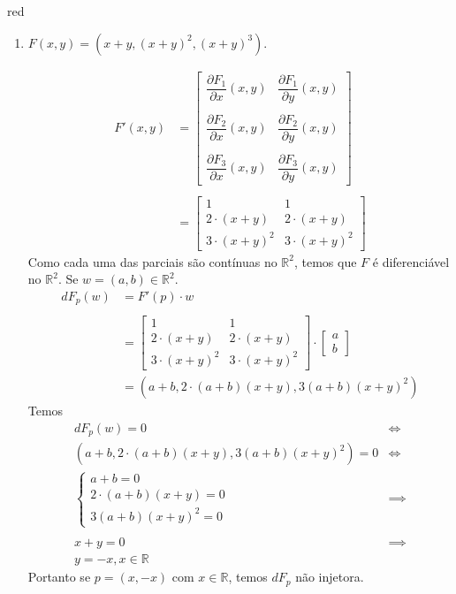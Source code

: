 \documentclass[12pt,leqno,twoside]{amsart}
\theoremstyle{definition}
\begin{document}
\begin{color}{red}
\begin{enumerate}
\begin{enumerate}
			\item $F(x,y) = \left(x+y, (x+y)^2,(x+y)^3\right)$.


				\begin{align*}
					F'(x,y) &= \left[\begin{array}{cc} \dfrac{\partial F_1}{\partial x} (x,y) &\dfrac{\partial F_1}{\partial y} (x,y)  \\~\\ \dfrac{\partial F_2}{\partial x} (x,y) &\dfrac{\partial F_2}{\partial y} (x,y)  \\~\\ \dfrac{\partial F_3}{\partial x} (x,y) &\dfrac{\partial F_3}{\partial y} (x,y)  \end{array}\right] \\~\\
						&= \left[\begin{array}{cc} 1 & 1\\ 2\cdot(x+y)& 2\cdot(x+y) \\ 3\cdot(x+y)^2 &  3\cdot(x+y)^2 \end{array}\right]
				\end{align*}
				Como cada uma das parciais são contínuas no $\mathbb{R}^2$, temos que $F$ é diferenciável no $\mathbb{R}^2$. Se $w = (a,b) \in \mathbb{R}^2$. \\
				\begin{align*}
					dF_p(w) &= F'(p)\cdot w\\~\\
					&= \left[\begin{array}{cc} 1 & 1\\ 2\cdot(x+y)& 2\cdot(x+y) \\ 3\cdot(x+y)^2 &  3\cdot(x+y)^2 \end{array}\right] \cdot  \left[\begin{array}{c} a \\ b \end{array}\right] \\
						&= \left(a+b, 2\cdot(a+b)(x+y), 3(a+b)(x+y)^2\right)
				\end{align*}
				Temos
				\begin{align*}
					dF_p(w) = 0 &\iff \\
					\left(a+b, 2\cdot(a+b)(x+y), 3(a+b)(x+y)^2\right) = 0  &\iff  \\
					\begin{cases}
						a+b = 0 \\
						2\cdot(a+b)(x+y) =0\\
						3(a+b)(x+y)^2 = 0
					\end{cases} &\implies \\~\\
					x+y = 0 &\implies \\
					y = -x, x\in \mathbb{R}
				\end{align*}
				Portanto se $p = \left(x, -x\right)$ com $x \in \mathbb{R}$, temos $dF_p$ não injetora.


\end{enumerate}
\end{enumerate}
\end{color}
\end{document}
